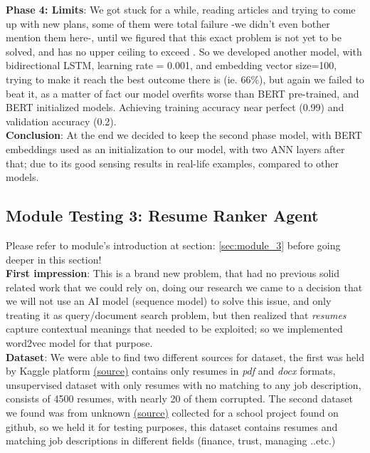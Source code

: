 \textbf{Phase 4: Limits}: We got stuck for a while, reading articles and trying to come up with new plans, some of them were total failure -we didn't even bother mention them here-, until we figured that this exact problem is not yet to be solved, and has no upper ceiling to exceed \cite{state_of_the_art_pers_text}. So we developed another model, with bidirectional LSTM, learning rate = 0.001, and embedding vector size=100, trying to make it reach the best outcome there is (ie. 66\%), but again we failed to beat it, as a matter of fact our model overfits worse than BERT pre-trained, and BERT initialized models. Achieving training accuracy near perfect (0.99) and validation accuracy (0.2).\\

\textbf{Conclusion}: At the end we decided to keep the second phase model, with BERT embeddings used as an initialization to our model, with two ANN layers after that; due to its good sensing results in real-life examples, compared to other models.






\newpage
\subsection{Module Testing 3: Resume Ranker Agent}
Please refer to module's introduction at section: \ref{sec:module_3} before going deeper in this section!\\

\textbf{First impression}: This is a brand new problem, that had no previous solid related work that we could rely on, doing our research we came to a decision that we will not use an AI model (sequence model) to solve this issue, and only treating it as query/document search problem, but then realized that \textit{resumes} capture contextual meanings that needed to be exploited; so we implemented word2vec model for that purpose.\\

\textbf{Dataset}: We were able to find two different sources for dataset, the first was held by Kaggle platform \href{https://www.kaggle.com/ranaelmahmoudy/curriculum-vitae-data-pdf}{(\underline{source})} contains only resumes in \textit{pdf} and \textit{docx} formats, unsupervised dataset with only resumes with no matching to any job description, consists of 4500 resumes, with nearly 20 of them corrupted. The second dataset we found was from unknown \href{https://drive.google.com/file/d/17M9oDPip5JFFFNJhDCBQKy8BMqoyxajU/view}{(\underline{source})} collected for a school project found on github, so we held it for testing purposes, this dataset contains resumes and matching job descriptions in different fields (finance, trust, managing ..etc.)\\

